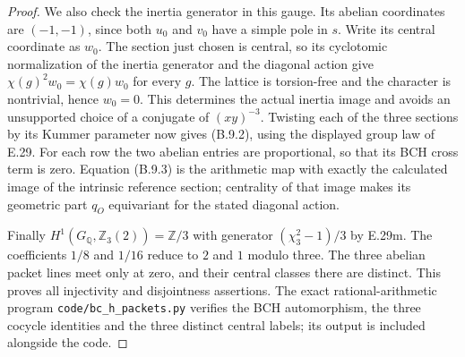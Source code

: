 \begin{proof}
We also check the inertia generator in this gauge.
Its abelian coordinates are $(-1,-1)$, since both
$u_0$ and $v_0$ have a simple pole in $s$.
Write its central coordinate as $w_0$.
The section just chosen is central, so its cyclotomic
normalization of the inertia generator and the
diagonal action give $\chi(g)^2w_0=\chi(g)w_0$ for
every $g$.  The lattice is torsion-free and the
character is nontrivial, hence $w_0=0$.
This determines the actual inertia image and avoids
an unsupported choice of a conjugate of $(xy)^{-3}$.
Twisting each of the three sections by its Kummer
parameter now gives (B.9.2), using the displayed group
law of E.29.  For each row the two abelian entries are
proportional, so that its BCH cross term is zero.
Equation (B.9.3) is the arithmetic map with exactly
the calculated image of the intrinsic reference
section; centrality of that image makes its geometric
part $q_O$ equivariant for the stated diagonal action.

Finally $H^1(G_{\mathbb Q},\mathbb Z_3(2))=\mathbb Z/3$
with generator $(\chi_3^2-1)/3$ by E.29m.
The coefficients $1/8$ and $1/16$ reduce to $2$ and
$1$ modulo three.  The three abelian packet lines
meet only at zero, and their central classes there
are distinct.  This proves all injectivity and
disjointness assertions.  The exact rational-arithmetic
program \texttt{code/bc\_h\_packets.py} verifies the
BCH automorphism, the three cocycle identities and
the three distinct central labels; its output is
included alongside the code.
\end{proof}

